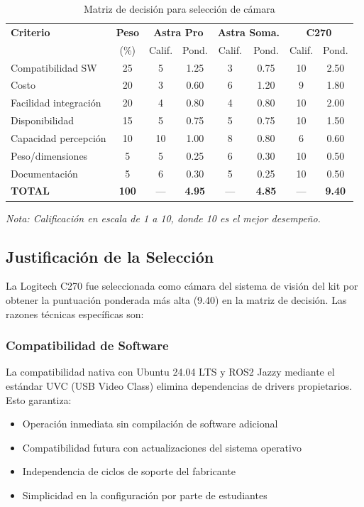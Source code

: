 \begin{table}[H]
\centering
\caption{Matriz de decisión para selección de cámara}
\label{tab:matriz_decision_camara}
\small
\begin{tabular}{|l|c|c|c|c|c|c|c|}
\hline
\textbf{Criterio} & \textbf{Peso} & \multicolumn{2}{c|}{\textbf{Astra Pro}} & \multicolumn{2}{c|}{\textbf{Astra Soma.}} & \multicolumn{2}{c|}{\textbf{C270}} \\
 & (\%) & Calif. & Pond. & Calif. & Pond. & Calif. & Pond. \\
\hline
Compatibilidad SW & 25 & 5 & 1.25 & 3 & 0.75 & 10 & 2.50 \\
Costo & 20 & 3 & 0.60 & 6 & 1.20 & 9 & 1.80 \\
Facilidad integración & 20 & 4 & 0.80 & 4 & 0.80 & 10 & 2.00 \\
Disponibilidad & 15 & 5 & 0.75 & 5 & 0.75 & 10 & 1.50 \\
Capacidad percepción & 10 & 10 & 1.00 & 8 & 0.80 & 6 & 0.60 \\
Peso/dimensiones & 5 & 5 & 0.25 & 6 & 0.30 & 10 & 0.50 \\
Documentación & 5 & 6 & 0.30 & 5 & 0.25 & 10 & 0.50 \\
\hline
\textbf{TOTAL} & \textbf{100} & --- & \textbf{4.95} & --- & \textbf{4.85} & --- & \textbf{9.40} \\
\hline
\end{tabular}
\end{table}

\textit{Nota: Calificación en escala de 1 a 10, donde 10 es el mejor desempeño.}

\subsection{Justificación de la Selección}

La Logitech C270 fue seleccionada como cámara del sistema de visión del kit por obtener la puntuación ponderada más alta (9.40) en la matriz de decisión. Las razones técnicas específicas son:

\subsubsection{Compatibilidad de Software}

La compatibilidad nativa con Ubuntu 24.04 LTS y ROS2 Jazzy mediante el estándar UVC (USB Video Class) elimina dependencias de drivers propietarios. Esto garantiza:

\begin{itemize}
    \item Operación inmediata sin compilación de software adicional
    \item Compatibilidad futura con actualizaciones del sistema operativo
    \item Independencia de ciclos de soporte del fabricante
    \item Simplicidad en la configuración por parte de estudiantes
\end{itemize}

